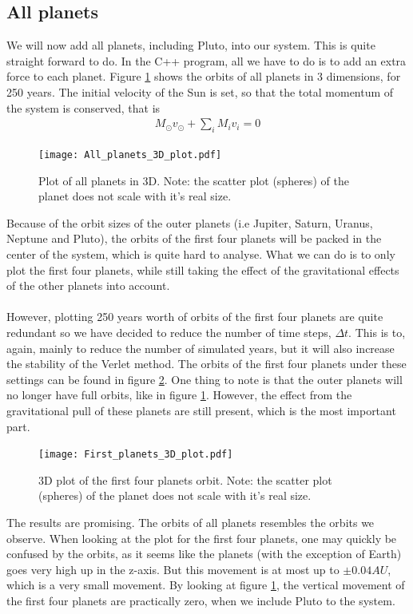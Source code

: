 \documentclass{article}
\begin{document}
\subsection{All planets}
We will now add all planets, including Pluto, into our system. This is quite straight forward to do. In the C++ program, all we have to do is to add an extra force to each planet. Figure \ref{fig:All_planets_3D} shows the orbits of all planets in 3 dimensions, for 250 years. The initial velocity of the Sun is set, so that the total momentum of the system is conserved, that is
\begin{align}
M_{\odot}v_{\odot} + \displaystyle \sum_i M_i v_i = 0
\end{align}
\begin{figure}[!h]
\centering
\texttt{[image: All\_planets\_3D\_plot.pdf]}
\caption{Plot of all planets in 3D. Note: the scatter plot (spheres) of the planet does not scale with it's real size.}
\label{fig:All_planets_3D}
\end{figure}
Because of the orbit sizes of the outer planets (i.e Jupiter, Saturn, Uranus, Neptune and Pluto), the orbits of the first four planets will be packed in the center of the system, which is quite hard to analyse. What we can do is to only plot the first four planets, while still taking the effect of the gravitational effects of the other planets into account. \\\\
However, plotting 250 years worth of orbits of the first four planets are quite redundant so we have decided to reduce the number of time steps, $\Delta t$. This is to, again, mainly to reduce the number of simulated years, but it will also increase the stability of the Verlet method. The orbits of the first four planets under these settings can be found in figure \ref{fig:First4_planets_3D}. One thing to note is that the outer planets will no longer have full orbits, like in figure \ref{fig:All_planets_3D}. However, the effect from the gravitational pull of these planets are still present, which is the most important part. \\
\begin{figure}[!h]
\centering
\texttt{[image: First\_planets\_3D\_plot.pdf]}
\caption{3D plot of the first four planets orbit. Note: the scatter plot (spheres) of the planet does not scale with it's real size.}
\label{fig:First4_planets_3D}
\end{figure}
The results are promising. The orbits of all planets resembles the orbits we observe. When looking at the plot for the first four planets, one may quickly be confused by the orbits, as it seems like the planets (with the exception of Earth) goes very high up in the z-axis. But this movement is at most up to $\pm 0.04AU$, which is a very small movement. By looking at figure \ref{fig:All_planets_3D}, the vertical movement of the first four planets are practically zero, when we include Pluto to the system.
\end{document}
